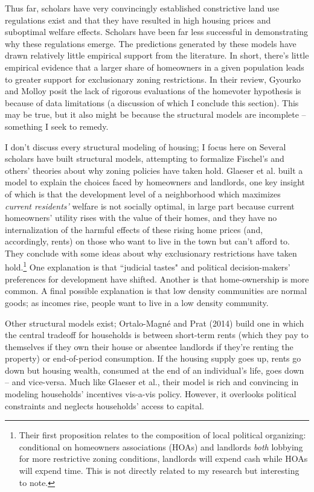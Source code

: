 \documentclass{article}[11pt]
\begin{document}
Thus far, scholars have very convincingly established constrictive land use regulations exist and that they have resulted in high housing prices and suboptimal welfare effects. Scholars have been far less successful in demonstrating why these regulations emerge. The predictions generated by these models have drawn relatively little empirical support from the literature. In short, there's little empirical evidence that a larger share of homeowners in a given population leads to greater support for exclusionary zoning restrictions. In their review, Gyourko and Molloy posit the lack of rigorous evaluations of the homevoter hypothesis is because of data limitations (a discussion of which I conclude this section). \citep{gyourko2015regulation} This may be true, but it also might be because the structural models are incomplete -- something I seek to remedy.

I don't discuss every structural modeling of housing; I focus here on Several scholars have built structural models, attempting to formalize Fischel's and others' theories about why zoning policies have taken hold. Glaeser et al. built a model to explain the choices faced by homeowners and landlords, one key insight of which is that the development level of a neighborhood which maximizes \textit{current residents'} welfare is not socially optimal, in large part because current homeowners' utility rises with the value of their homes, and they have no internalization of the harmful effects of these rising home prices (and, accordingly, rents) on those who want to live in the town but can't afford to. \citep{glaeser2005} They conclude with some ideas about why exclusionary restrictions have taken hold.\footnote{Their first proposition relates to the composition of local political organizing: conditional on homeowners associations (HOAs) and landlords \textit{both} lobbying for more restrictive zoning conditions, landlords will expend cash while HOAs will expend time. This is not directly related to my research but interesting to note.} One explanation is that ``judicial tastes" and political decision-makers' preferences for development have shifted. Another is that home-ownership is more common. A final possible explanation is that low density communities are normal goods; as incomes rise, people want to live in a low density community. 

Other structural models exist; Ortalo-Magné and Prat (2014) build one in which the central tradeoff for households is between short-term rents (which they pay to themselves if they own their house or absentee landlords if they're renting the property) or end-of-period consumption. \citep{ortalo2014political} If the housing supply goes up, rents go down but housing wealth, consumed at the end of an individual's life, goes down -- and vice-versa. Much like Glaeser et al., their model is rich and convincing in modeling households' incentives vis-a-vis policy. However, it overlooks political constraints and neglects households' access to capital. 
\end{document}
